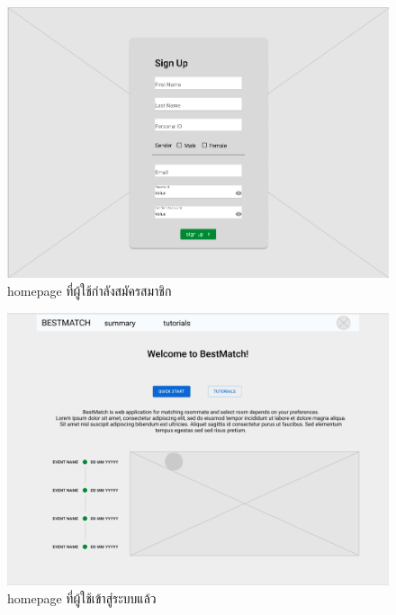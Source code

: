 \begin{enumerate}
  \begin{figure}[h]
  \begin{center}
  \includegraphics[width=\linewidth]{photo/student/register.png}
  \end{center}
  \caption{homepage ที่ผู้ใช้กำลังสมัครสมาชิก}
  \label{fig:hp-reg}
  \end{figure}

  \begin{figure}[h]
  \begin{center}
  \includegraphics[width=\linewidth]{photo/student/home-auth.png}
  \end{center}
  \caption{homepage ที่ผู้ใช้เข้าสู่ระบบแล้ว}
  \label{fig:hp-auth}
  \end{figure}


\end{enumerate}
